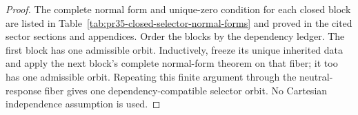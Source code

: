 \begin{proof}
The complete normal form and unique-zero condition for each closed block are listed in Table~\ref{tab:pr35-closed-selector-normal-forms} and proved in the cited sector sections and appendices.  Order the blocks by the dependency ledger.  The first block has one admissible orbit.  Inductively, freeze its unique inherited data and apply the next block's complete normal-form theorem
on that fiber; it too has one admissible orbit.  Repeating this finite argument through the neutral-response fiber gives one dependency-compatible selector orbit.  No Cartesian independence assumption is used.
\end{proof}
